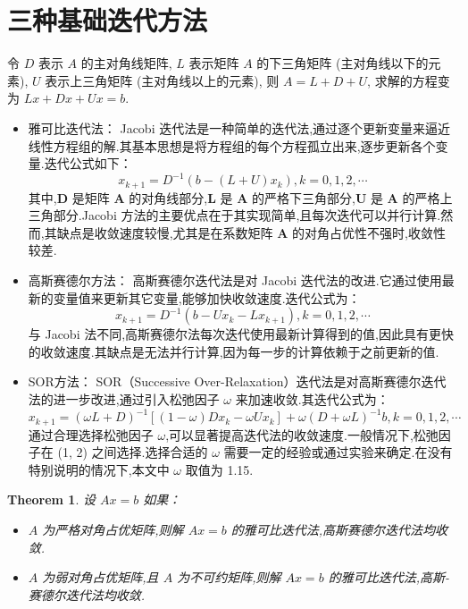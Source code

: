 \documentclass[a4paper]{article}
\numberwithin{equation}{section}
\newtheorem{theorem}{Theorem}
\newcommand{\bm}[1]{\boldsymbol{#1}}    %
\begin{document}
\section{三种基础迭代方法}
令 $D$ 表示 $A$ 的主对角线矩阵, $L$ 表示矩阵  $A$ 的下三角矩阵 (主对角线以下的元素), $U$ 表示上三角矩阵 (主对角线以上的元素), 则  $A=L+D+U$, 求解的方程变为  $L x+D x+U x=b$.
\begin{itemize}
    \item 雅可比迭代法：
          Jacobi 迭代法是一种简单的迭代法,通过逐个更新变量来逼近线性方程组的解.其基本思想是将方程组的每个方程孤立出来,逐步更新各个变量.迭代公式如下：
          \begin{equation}
              \label{equ:jacobi}
              x_{k+1}=D^{-1}\left(b-(L+U) x_{k}\right), k=0,1,2, \cdots
          \end{equation}
          其中,$\bm{D}$ 是矩阵 $\bm{A}$ 的对角线部分,$\bm{L}$ 是 $\bm{A}$ 的严格下三角部分,$\bm{U}$ 是 $\bm{A}$ 的严格上三角部分.Jacobi 方法的主要优点在于其实现简单,且每次迭代可以并行计算.然而,其缺点是收敛速度较慢,尤其是在系数矩阵 $\bm{A}$ 的对角占优性不强时,收敛性较差.
    \item 高斯赛德尔方法：
          高斯赛德尔迭代法是对 Jacobi 迭代法的改进.它通过使用最新的变量值来更新其它变量,能够加快收敛速度.迭代公式为：
          \begin{equation}
              \label{equ:gauss}
              x_{k+1}=D^{-1}\left(b-U x_{k}-L x_{k+1}\right), k=0,1,2, \cdots
          \end{equation}
          与 Jacobi 法不同,高斯赛德尔法每次迭代使用最新计算得到的值,因此具有更快的收敛速度.其缺点是无法并行计算,因为每一步的计算依赖于之前更新的值.
    \item SOR方法：
          SOR（Successive Over-Relaxation）迭代法是对高斯赛德尔迭代法的进一步改进,通过引入松弛因子 $\omega$ 来加速收敛.其迭代公式为：
          \begin{equation}
              \label{equ:sor}
              x_{k+1}=(\omega L+D)^{-1}\left[(1-\omega) D x_{k}-\omega U x_{k}\right]+\omega(D+\omega L)^{-1} b, k=0,1,2, \cdots
          \end{equation}
          通过合理选择松弛因子 $\omega$,可以显著提高迭代法的收敛速度.一般情况下,松弛因子在 (1, 2) 之间选择.选择合适的 $\omega$ 需要一定的经验或通过实验来确定.在没有特别说明的情况下,本文中 $\omega$ 取值为 1.15.
\end{itemize}

\begin{theorem}
    设 $Ax=b$ 如果：
    \begin{itemize}
        \item $A$ 为严格对角占优矩阵,则解 $Ax=b$ 的雅可比迭代法,高斯赛德尔迭代法均收敛.
        \item $A$ 为弱对角占优矩阵,且 $A$ 为不可约矩阵,则解 $Ax=b$ 的雅可比迭代法,高斯-赛德尔迭代法均收敛.
    \end{itemize}
\end{theorem}
\end{document}
